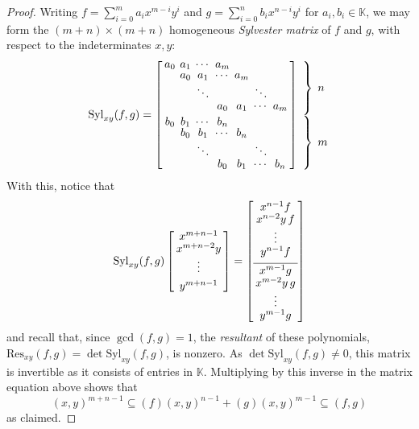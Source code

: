 \documentclass[reqno]{amsart}
\numberwithin{equation}{section}
\theoremstyle{definition}
\def\K{\mathbb{K}}
\def\Res{\mathrm{Res}}
\def\Syl{\mathrm{Syl}}
\begin{document}
\begin{proof}
Writing $f= \sum_{i=0}^m a_ix^{m-i}y^i$ and $g = \sum_{i=0}^n b_ix^{n-i}y^i$ for $a_i,b_i \in \K$, we may form the $(m+n)\times (m+n)$ homogeneous \textit{Sylvester matrix} of $f$ and $g$, with respect to the indeterminates $x,y$:
\[
\arraycolsep=2pt\def\arraystretch{0.8}
\Syl_{xy}(f,g)=
\left[
\begin{array}{ccccccc}
a_0 & a_{1} & \cdots & a_m &        &        &        \\
    & a_0     & a_{1}& \cdots & a_m &        &        \\
    &         & \ddots &        &     & \ddots &        \\
    &         &        & a_0    & a_{1} & \cdots & a_m \\[1ex]
b_0 & b_{1} & \cdots & b_n &        &        &        \\
    & b_0     & b_{1}& \cdots & b_n &        &        \\
    &         & \ddots &        &     & \ddots &        \\
    &         &        & b_0    & b_{1} & \cdots & b_n
\end{array}
\right]
\begin{array}{l}
\left.\rule{0pt}{0.95cm}\right\}\;\text{$n$}\\[6pt]
\left.\rule{0pt}{0.95cm}\right\}\;\text{$m$}
\end{array}
\]
With this, notice that 
\[
\arraycolsep=2pt\def\arraystretch{0.8}
\Syl_{xy}(f,g) \left[\begin{array}{c}
    x^{m+n-1}\\
    x^{m+n-2}y\\
    \vdots \\[1ex]
    y^{m+n-1}
\end{array}\right]= \left[\begin{array}{c}
    x^{n-1}f\\
    x^{n-2}y\,f\\
    \vdots\\
    y^{n-1}f\\[1ex]
    \hline\\[-2ex]
    x^{m-1}g\\
    x^{m-2}y\,g\\
    \vdots\\
    y^{m-1}g
\end{array}
\right]
\]
and recall that, since $\gcd (f,g) =1$, the \textit{resultant} of these polynomials, $\Res_{xy}(f,g) =  \det \Syl_{xy}(f,g)$, is nonzero. As $\det \Syl_{xy}(f,g) \neq 0$, this matrix is invertible as it consists of entries in $\K$. Multiplying by this inverse in the matrix equation above shows that 
$$(x,y)^{m+n-1} \subseteq (f)(x,y)^{n-1}+(g)(x,y)^{m-1} \subseteq (f,g)$$
as claimed.
\end{proof}
\end{document}
